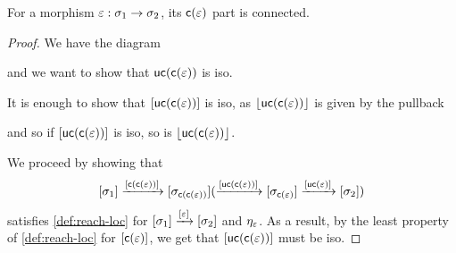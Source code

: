 \begin{lemma}\label{lem:con-fact-is-con}
    For a morphism $\varepsilon : \sigma_1 \to \sigma_2$, its $\mathsf{c}(\varepsilon)$ part is connected.
\end{lemma}
\begin{proof}
    We have the diagram
     and we want to show that $\mathsf{uc}(\mathsf{c}(\varepsilon))$ is iso.

    It is enough to show that $[\mathsf{uc}(\mathsf{c}(\varepsilon))]$ is iso, as $\lfloor\mathsf{uc}(\mathsf{c}(\varepsilon))\rfloor$ is given by the pullback
    \begin{center}
    \end{center}
    and so if $[\mathsf{uc}(\mathsf{c}(\varepsilon))]$ is iso, so is $\lfloor\mathsf{uc}(\mathsf{c}(\varepsilon))\rfloor$.

    We proceed by showing that 
    \[ [\sigma_1] \xrightarrow{[\mathsf{c}(\mathsf{c}(\varepsilon))]} [\sigma_{\mathsf{c}(\mathsf{c}(\varepsilon))}] (\xrightarrow{[\mathsf{uc}(\mathsf{c}(\varepsilon))]} [\sigma_{\mathsf{c}(\varepsilon)}] \xrightarrow{[\mathsf{uc}(\varepsilon)]} [\sigma_2]) \] 
    satisfies \cref{def:reach-loc} for $[\sigma_1] \xrightarrow{[\varepsilon]} [\sigma_2]$ and $\eta_\varepsilon$.
    As a result, by the least property of \cref{def:reach-loc} for $[\mathsf{c}(\varepsilon)]$, we get that $[\mathsf{uc}(\mathsf{c}(\varepsilon))]$ must be iso.


\end{proof}
